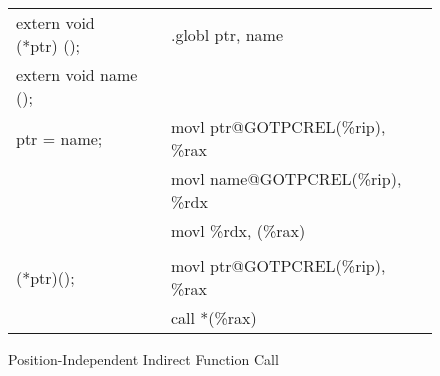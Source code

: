 \begin{figure}[H]
\Hrule
\caption{Position-Independent Indirect Function Call}
\begin{center}
\begin{tabular}{|l|c|l|}
\cline{1-1}\cline{3-3}
extern void (*ptr) ();    &&.globl ptr, name\\
extern void name ();      && \\
ptr = name;               &&movl ptr@GOTPCREL(\%rip), \%rax  \\
                          &&movl name@GOTPCREL(\%rip), \%rdx  \\
                          &&movl \%rdx, (\%rax)  \\
                          &&  \\
(*ptr)();                 &&movl ptr@GOTPCREL(\%rip), \%rax  \\
                          &&call *(\%rax)  \\
\cline{1-1}\cline{3-3}
\end{tabular}
\end{center}
\Hrule
\end{figure}


